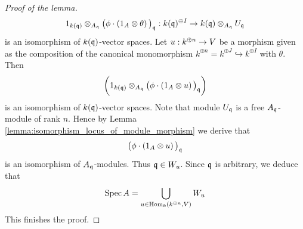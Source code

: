 \begin{proof}[Proof of the lemma]
$$1_{k(\mathfrak{q})}\otimes_{A_{\mathfrak{q}}}\big(\phi\cdot \left(1_A\otimes \theta\right)\big)_{\mathfrak{q}}:k(\mathfrak{q})^{\oplus I}\rightarrow k(\mathfrak{q})\otimes_{A_{\mathfrak{q}}}U_{\mathfrak{q}}$$
is an isomorphism of $k(\mathfrak{q})$-vector spaces. Let $u:k^{\oplus n}\rightarrow V$ be a morphism given as the composition of the canonical monomorphism $k^{\oplus n} = k^{\oplus J}\hookrightarrow k^{\oplus I}$ with $\theta$. Then
$$\bigg(1_{k(\mathfrak{q})}\otimes_{A_{\mathfrak{q}}}\big(\phi\cdot \left(1_A\otimes u\right)\big)_{\mathfrak{q}}\bigg)$$
is an isomorphism of $k(\mathfrak{q})$-vector spaces. Note that module $U_{\mathfrak{q}}$ is a free $A_{\mathfrak{q}}$-module of rank $n$. Hence by Lemma \ref{lemma:isomorphism_locus_of_module_morphism} we derive that
$$\big(\phi\cdot \left(1_A\otimes u\right)\big)_{\mathfrak{q}}$$
is an isomorphism of $A_{\mathfrak{q}}$-modules. Thus $\mathfrak{q} \in W_u$. Since $\mathfrak{q}$ is arbitrary, we deduce that
$$\mathrm{Spec}\, A = \bigcup_{u\in \mathrm{Hom}_{k}(k^{\oplus n},V)}W_u$$
This finishes the proof.
\end{proof}


